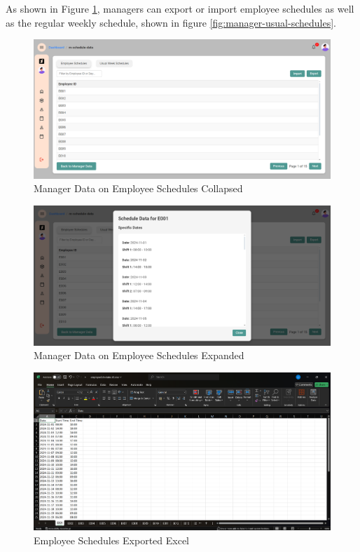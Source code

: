 \documentclass[a4paper,12pt, oneside]{report}
\begin{document}
\begin{itemize}
   As shown in Figure \ref{fig:manager-employee-schedules-c}, managers can export or import employee schedules as well as the regular weekly schedule, shown in figure \ref{fig:manager-usual-schedules}.
    \begin{figure}[H]
    \centering
    \includegraphics[width=0.8\columnwidth]{ManagerPages/ManagerScheduleData.png}
    \caption{Manager Data on Employee Schedules Collapsed}
    \label{fig:manager-employee-schedules-c}
    \end{figure}

    \begin{figure}[H]
    \centering
    \includegraphics[width=0.8\columnwidth]{ManagerPages/ManagerScheduleData2.png}
    \caption{Manager Data on Employee Schedules Expanded}
    \label{fig:manager-employee-schedules-e}
    \end{figure}

    \begin{figure}[H]
    \centering
    \includegraphics[width=0.8\columnwidth]{ManagerPages/ManagerScheduleData4.png}
    \caption{Employee Schedules Exported Excel}
    \label{fig:manager-employee-schedules-excel}
    \end{figure}


\end{itemize}
\end{document}
